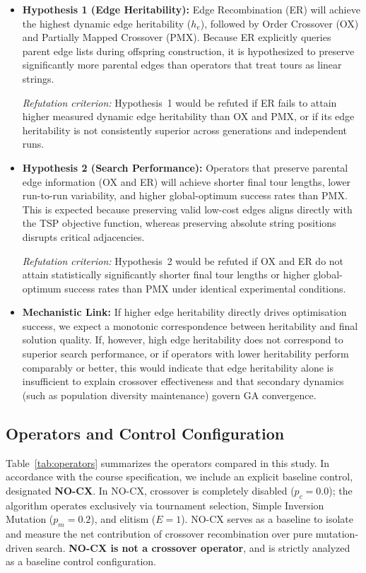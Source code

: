 \documentclass[10pt,a4paper]{article}
\begin{document}
\begin{itemize}
    \item \textbf{Hypothesis 1 (Edge Heritability):} Edge Recombination (ER) will achieve the highest dynamic edge heritability ($h_e$), followed by Order Crossover (OX) and Partially Mapped Crossover (PMX). Because ER explicitly queries parent edge lists during offspring construction, it is hypothesized to preserve significantly more parental edges than operators that treat tours as linear strings.
    
    \textit{Refutation criterion:} Hypothesis~1 would be refuted if ER fails to attain higher measured dynamic edge heritability than OX and PMX, or if its edge heritability is not consistently superior across generations and independent runs.

    \item \textbf{Hypothesis 2 (Search Performance):} Operators that preserve parental edge information (OX and ER) will achieve shorter final tour lengths, lower run-to-run variability, and higher global-optimum success rates than PMX. This is expected because preserving valid low-cost edges aligns directly with the TSP objective function, whereas preserving absolute string positions disrupts critical adjacencies.

    \textit{Refutation criterion:} Hypothesis~2 would be refuted if OX and ER do not attain statistically significantly shorter final tour lengths or higher global-optimum success rates than PMX under identical experimental conditions.

    \item \textbf{Mechanistic Link:} If higher edge heritability directly drives optimisation success, we expect a monotonic correspondence between heritability and final solution quality. If, however, high edge heritability does not correspond to superior search performance, or if operators with lower heritability perform comparably or better, this would indicate that edge heritability alone is insufficient to explain crossover effectiveness and that secondary dynamics (such as population diversity maintenance) govern GA convergence.
\end{itemize}

\subsection{Operators and Control Configuration}

Table~\ref{tab:operators} summarizes the operators compared in this study. In accordance with the course specification, we include an explicit baseline control, designated \textbf{NO-CX}. In NO-CX, crossover is completely disabled ($p_c = 0.0$); the algorithm operates exclusively via tournament selection, Simple Inversion Mutation ($p_m = 0.2$), and elitism ($E = 1$). NO-CX serves as a baseline to isolate and measure the net contribution of crossover recombination over pure mutation-driven search. \textbf{NO-CX is not a crossover operator}, and is strictly analyzed as a baseline control configuration.
\end{document}
